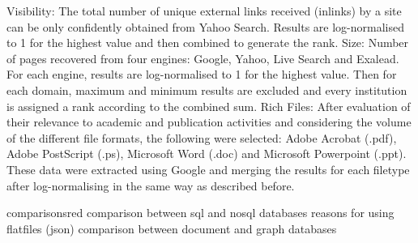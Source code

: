 Visibility: The total number of unique external links received (inlinks) by a site can be only confidently obtained from Yahoo Search. Results are log-normalised to 1 for the highest value and
then combined to generate the rank.
Size: Number of pages recovered from four engines: Google, Yahoo, Live Search and Exalead. For each engine, results are log-normalised to 1 for the highest value. Then for each domain, maximum
and minimum results are excluded and every institution is assigned a rank according to the combined sum.
Rich Files: After evaluation of their relevance to academic and publication activities and considering the volume of the different file formats, the following were selected: Adobe Acrobat (.pdf), Adobe PostScript (.ps), Microsoft Word (.doc) and Microsoft Powerpoint (.ppt). These data were extracted using Google and merging the results for each filetype after log-normalising in the same way as described before.
\begin{review_comment}{comparisons}{red}
{
    comparison between sql and nosql databases
    reasons for using flatfiles (json)
    comparison between document and graph databases
}
\end{review_comment}